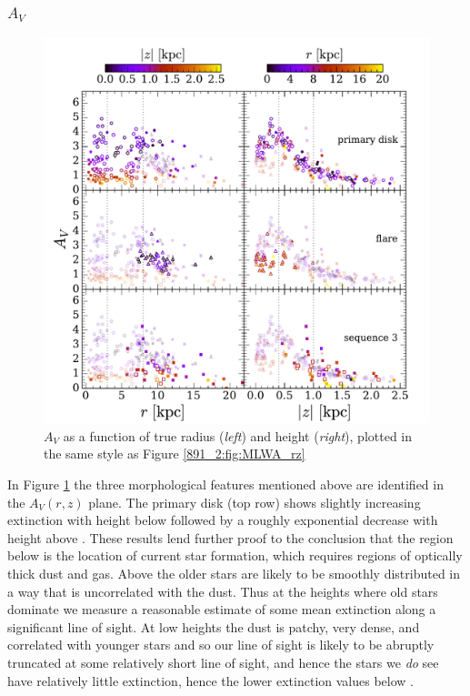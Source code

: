 \subsubsection{$A_V$}

\begin{figure}
  \centering
  \includegraphics[width=\textwidth]{891_2/figs/AV_rz_all.pdf}
  \caption[$A_V$ vs ($r,|z|$)]{\fixspacing\label{891_2:fig:AV_rz}$A_V$
    as a function of true radius (\emph{left}) and height
    (\emph{right}), plotted in the same style as Figure
    \ref{891_2:fig:MLWA_rz}}
\end{figure}

In Figure \ref{891_2:fig:AV_rz} the three morphological features mentioned
above are identified in the $A_V(r,z)$ plane. The primary disk (top
row) shows slightly increasing extinction with height below  followed by a roughly exponential decrease with height
above . These results lend further proof to the
conclusion that the region below  is the location of
current star formation, which requires regions of optically thick dust
and gas. Above  the older stars are likely to be
smoothly distributed in a way that is uncorrelated with the dust. Thus
at the heights where old stars dominate we measure a reasonable
estimate of some mean extinction along a significant line of sight. At
low heights the dust is patchy, very dense, and correlated with
younger stars and so our line of sight is likely to be abruptly
truncated at some relatively short line of sight, and hence the stars
we \emph{do} see have relatively little extinction, hence the lower
extinction values below .

